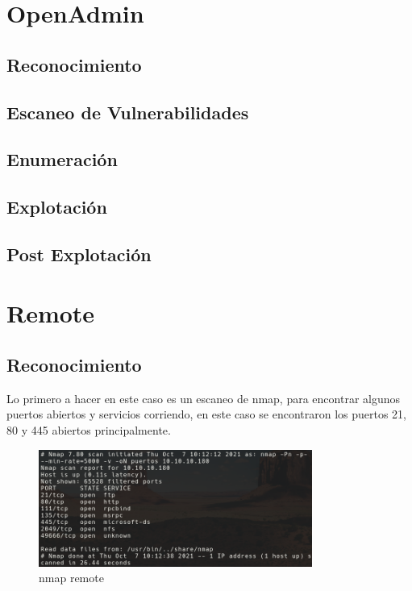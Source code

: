 \documentclass{article}
\begin{document}


\clearpage
\tableofcontents
\clearpage
\section{OpenAdmin}
\subsection{Reconocimiento}
\subsection{Escaneo de Vulnerabilidades}
\subsection{Enumeración}
\subsection{Explotación}
\subsection{Post Explotación}


\clearpage
\section{Remote}
\subsection{Reconocimiento}
Lo primero a hacer en este caso es un escaneo de nmap, para encontrar algunos puertos abiertos y servicios corriendo, en este caso se encontraron los puertos 21, 80 y 445 abiertos principalmente.

\begin{figure}[h]
	\center
	\includegraphics[width=0.8\textwidth]{images/remote/nmap_remote.png}
	\caption{nmap remote}
\end{figure}
 
\end{document}
